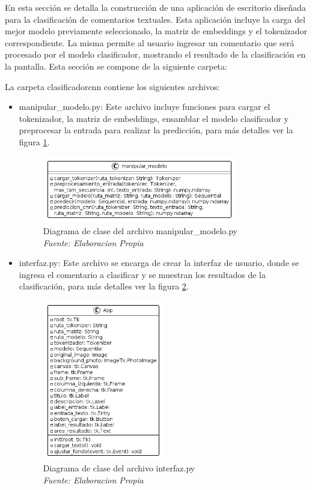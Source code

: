 En esta sección se detalla la construcción de una aplicación de escritorio diseñada para la clasificación de comentarios textuales. Esta aplicación incluye la carga del mejor modelo previamente seleccionado, la matriz de embeddings y el tokenizador correspondiente. La misma permite al usuario ingresar un comentario que será procesado por el modelo clasificador, mostrando el resultado de la clasificación en la pantalla. Esta sección se compone de la siguiente carpeta:

La carpeta clasificadorcnn contiene los siguientes archivos:

\begin{itemize}

\item manipular\_modelo.py: Este archivo incluye funciones para cargar el tokenizador, la matriz de embeddings, ensamblar el modelo clasificador y preprocesar la entrada para realizar la predicción, para más detalles ver la figura \ref{fig:uml12}.

\begin{figure}[h!]
	\includegraphics[width=0.8\textwidth]{capitulo5/figuras/fig12.png}
	\caption{Diagrama de clase del archivo manipular\_modelo.py
		\\\textit{Fuente: Elaboracion Propia}}
	\label{fig:uml12}
\end{figure}

\item interfaz.py: Este archivo se encarga de crear la interfaz de usuario, donde se ingresa el comentario a clasificar y se muestran los resultados de la clasificación, para más detalles ver la figura \ref{fig:uml13}.

\begin{figure}[h!]
	\includegraphics[width=0.5\textwidth]{capitulo5/figuras/fig13.png}
	\caption[Diagrama de clase del archivo interfaz.py]{Diagrama de clase del archivo interfaz.py
		\\\textit{Fuente: Elaboracion Propia}}
	\label{fig:uml13}
\end{figure}


\end{itemize}
